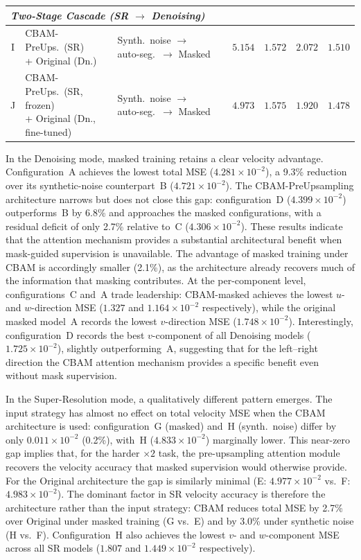 \documentclass[11pt]{article}
\begin{document}
\begin{table}[!htbp]
\begin{tabular}{cll l rrrr}
    \midrule
    \multicolumn{8}{l}{\textit{Two-Stage Cascade (SR $\to$ Denoising)}} \\
    \midrule
    I & \makecell[l]{CBAM-PreUps.\ (SR)\\+ Original (Dn.)} & \makecell[l]{Synth.\ noise $\to$\\auto-seg.\ $\to$ Masked} & & $5.154$ & $1.572$ & $2.072$ & $1.510$ \\
    J & \makecell[l]{CBAM-PreUps.\ (SR, frozen)\\+ Original (Dn., fine-tuned)} & \makecell[l]{Synth.\ noise $\to$\\auto-seg.\ $\to$ Masked} & & $4.973$ & $1.575$ & $1.920$ & $1.478$ \\
    \bottomrule
  \end{tabular}
\end{table}

In the Denoising mode, masked training retains a clear velocity advantage.  Configuration~A
achieves the lowest total MSE ($4.281{\times}10^{-2}$), a 9.3\% reduction over its
synthetic-noise counterpart~B ($4.721{\times}10^{-2}$).  The CBAM-PreUpsampling architecture
narrows but does not close this gap: configuration~D ($4.399{\times}10^{-2}$) outperforms~B by
6.8\% and approaches the masked configurations, with a residual deficit of only 2.7\% relative
to~C ($4.306{\times}10^{-2}$).  These results indicate that the attention mechanism provides a
substantial architectural benefit when mask-guided supervision is unavailable.  The advantage of
masked training under CBAM is accordingly smaller (2.1\%), as the architecture already recovers
much of the information that masking contributes.  At the per-component level, configurations~C
and~A trade leadership: CBAM-masked achieves the lowest $u$- and $w$-direction MSE
($1.327$ and $1.164{\times}10^{-2}$ respectively), while the original masked model~A records the
lowest $v$-direction MSE ($1.748{\times}10^{-2}$).  Interestingly, configuration~D records the
best $v$-component of all Denoising models ($1.725{\times}10^{-2}$), slightly outperforming~A,
suggesting that for the left--right direction the CBAM attention mechanism provides a specific
benefit even without mask supervision.

In the Super-Resolution mode, a qualitatively different pattern emerges.  The input strategy has
almost no effect on total velocity MSE when the CBAM architecture is used: configuration~G
(masked) and~H (synth.\ noise) differ by only $0.011{\times}10^{-2}$ (0.2\%), with~H
($4.833{\times}10^{-2}$) marginally lower.  This near-zero gap implies that, for the harder
$\times 2$ task, the pre-upsampling attention module recovers the velocity accuracy that masked
supervision would otherwise provide.  For the Original architecture the gap is similarly minimal
(E: $4.977{\times}10^{-2}$ vs.\ F: $4.983{\times}10^{-2}$).  The dominant factor in SR velocity
accuracy is therefore the architecture rather than the input strategy: CBAM reduces total MSE by
2.7\% over Original under masked training (G vs.\ E) and by 3.0\% under synthetic noise (H
vs.\ F).  Configuration~H also achieves the lowest $v$- and $w$-component MSE across all SR
models ($1.807$ and $1.449{\times}10^{-2}$ respectively).
\end{document}
